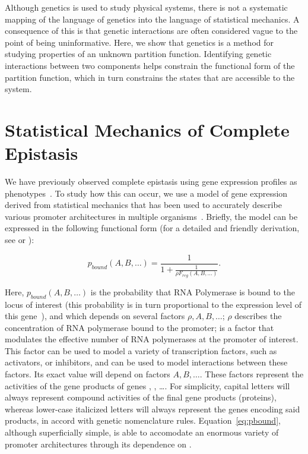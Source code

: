 Although genetics is used to study physical systems, there is not a systematic
mapping of the language of genetics into the language of statistical mechanics.
A consequence of this is that genetic interactions are often considered vague to
the point of being uninformative. Here, we show that genetics is a method for
studying properties of an unknown partition function. Identifying genetic
interactions between two components helps constrain the functional form of the
partition function, which in turn constrains the states that are accessible to
the system.

\section*{Statistical Mechanics of Complete Epistasis}
We have previously observed complete epistasis using gene expression profiles as
phenotypes~\citep{Angeles-Albores2017,Angeles-Albores2018a}. To study how this
can occur, we use a model of gene expression derived from statistical mechanics
that has been used to accurately describe various promoter architectures in
multiple organisms~\citep{Bintu2005a,Garcia2007,Bothma2015,Raveh-Sadka2009}.
Briefly, the model can be expressed in the following functional form (for a
detailed and friendly derivation, see \citet{Bintu2005a} or \citet{Garcia2007}):

\begin{equation}
  p_{bound}(A, B, \ldots) = \frac{1}{1 + \frac{1}{\rho F_{reg}(A, B, \ldots)}}.
  \label{eq:pbound}
\end{equation}

Here, \(p_{bound}(A, B, \ldots)\) is the probability that RNA Polymerase is
bound to the locus of interest (this probability is in turn proportional to the
expression level of this gene~\citep{}), and which depends on several factors
\(\rho, A, B, \ldots \); \(\rho \) describes the concentration of RNA polymerase
bound to the promoter; \Freg{} is a factor that modulates the effective number
of RNA polymerases at the promoter of interest. This factor can be used to model
a variety of transcription factors, such as activators, or inhibitors, and can
be used to model interactions between these factors. Its exact value will depend
on factors \(A, B, \ldots \). These factors represent the activities of the gene
products of genes , , \dots. For simplicity, capital letters
will always represent compound activities of the final gene products (proteins),
whereas lower-case italicized letters will always represent the genes encoding
said products, in accord with \cel{} genetic nomenclature rules.
Equation~\ref{eq:pbound}, although superficially simple, is able to accomodate
an enormous variety of promoter architectures through its dependence on \Freg{}.

